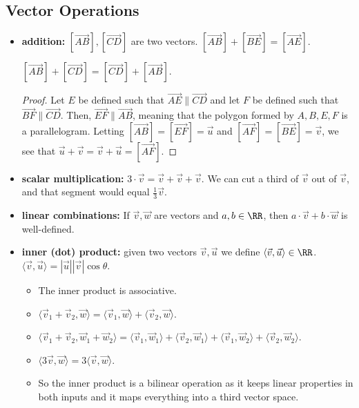 \documentclass{scrartcl}
\begin{document}
\subsection{Vector Operations}
\begin{itemize}
	\item \textbf{addition:} $[\vec{AB}], [\vec{CD}]$ are two vectors. $[\vec{AB}]+[\vec{BE}] = [\vec{AE}]$. 
	\begin{lemma}
		$[\vec{AB}] + [\vec{CD}] = [\vec{CD}] + [\vec{AB}]$.
	\end{lemma}
	\begin{proof}
		Let $E$ be defined such that $\vec{AE} \parallel \vec{CD}$ and let $F$ be defined such that 
		$\vec{BF} \parallel \vec{CD}$. Then, $\vec{EF} \parallel \vec{AB}$, meaning that the polygon
		formed by $A, B, E, F$ is a parallelogram. Letting $[\vec{AB}] = [\vec{EF}] = \vec u$ and
		$[\vec{AF}] = [\vec{BE}] = \vec v$, we see that $\vec u + \vec v = \vec v + \vec u = [\vec{AF}]$.
	\end{proof}
	\item \textbf{scalar multiplication:} $3 \cdot \vec v = \vec v + \vec v + \vec v$. We can cut a third
	of $\vec v$ out of $\vec v$, and that segment would equal $\frac{1}{3} \vec v$.
	\item \textbf{linear combinations:} If $\vec v, \vec w$ are vectors and $a, b \in \RR$, then
	$a \cdot \vec v + b \cdot \vec w$ is well-defined.
	\item \textbf{inner (dot) product:} given two vectors $\vec v, \vec u$ we define $\langle\vec v, \vec u\rangle \in \RR$.
	$\langle \vec v, \vec u \rangle = |\vec u| |\vec v| \cos \theta$. 
	\begin{itemize}
		\item The inner product is associative. 
		\item $\langle \vec v_1 + \vec v_2, \vec w \rangle = \langle \vec v_1, 
		\vec w \rangle + \langle \vec v_2, \vec w \rangle$.
		\item $\langle \vec v_1 + \vec v_2, \vec w_1 + \vec w_2 \rangle = \langle \vec v_1, 
		\vec w_1 \rangle + \langle \vec v_2, \vec w_1 \rangle + \langle \vec v_1, \vec w_2 \rangle + 
		\langle \vec v_2, \vec w_2 \rangle$.
		\item $\langle 3 \vec v, \vec w \rangle = 3 \langle \vec v, \vec w \rangle$.
		\item So the inner product is a bilinear operation as it keeps linear properties in both inputs
		and it maps everything into a third vector space.
	\end{itemize}
\end{itemize}
\end{document}
